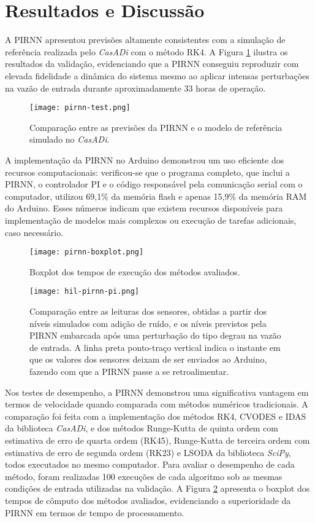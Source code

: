 \section{Resultados e Discussão}

A PIRNN apresentou previsões altamente consistentes com a simulação de referência realizada pelo \textit{CasADi} com o método RK4. A Figura \ref{fig:pirnn-results} ilustra os resultados da validação, evidenciando que a PIRNN conseguiu reproduzir com elevada fidelidade a dinâmica do sistema mesmo ao aplicar intensas perturbações na vazão de entrada durante aproximadamente 33 horas de operação.

\begin{figure}[ht]
  \centering
  \texttt{[image: pirnn-test.png]}
  \caption{Comparação entre as previsões da PIRNN e o modelo de referência simulado no \textit{CasADi}.}
  \label{fig:pirnn-results}
\end{figure}

A implementação da PIRNN no Arduino demonstrou um uso eficiente dos recursos computacionais: verificou-se que o programa completo, que inclui a PIRNN, o controlador PI e o código responsável pela comunicação serial com o computador, utilizou 69,1\% da memória flash e apenas 15,9\% da memória RAM do Arduino. Esses números indicam que existem recursos disponíveis para implementação de modelos mais complexos ou execução de tarefas adicionais, caso necessário.

\begin{figure}[ht]
  \centering
  \texttt{[image: pirnn-boxplot.png]}
  \caption{Boxplot dos tempos de execução dos métodos avaliados.}
  \label{fig:pirnn-benchmark-lite}
\end{figure}

\begin{figure*}[ht]
  \centering
  \texttt{[image: hil-pirnn-pi.png]}
  \caption{Comparação entre as leituras dos sensores, obtidas a partir dos níveis simulados com adição de ruído, e os níveis previstos pela PIRNN embarcada após uma perturbação do tipo degrau na vazão de entrada. A linha preta ponto-traço vertical indica o instante em que os valores dos sensores deixam de ser enviados ao Arduino, fazendo com que a PIRNN passe a se retroalimentar.}
  \label{fig:sil-pirnn}
\end{figure*}

Nos testes de desempenho, a PIRNN demonstrou uma significativa vantagem em termos de velocidade quando comparada com métodos numéricos tradicionais. A comparação foi feita com a implementação dos métodos RK4, CVODES e IDAS da biblioteca \textit{CasADi}, e dos métodos Runge-Kutta de quinta ordem com estimativa de erro de quarta ordem (RK45), Runge-Kutta de terceira ordem com estimativa de erro de segunda ordem (RK23) e LSODA da biblioteca \textit{SciPy}, todos executados no mesmo computador. Para avaliar o desempenho de cada método, foram realizadas 100 execuções de cada algoritmo sob as mesmas condições de entrada utilizadas na validação. A Figura \ref{fig:pirnn-benchmark-lite} apresenta o boxplot dos tempos de cômputo dos métodos avaliados, evidenciando a superioridade da PIRNN em termos de tempo de processamento.

